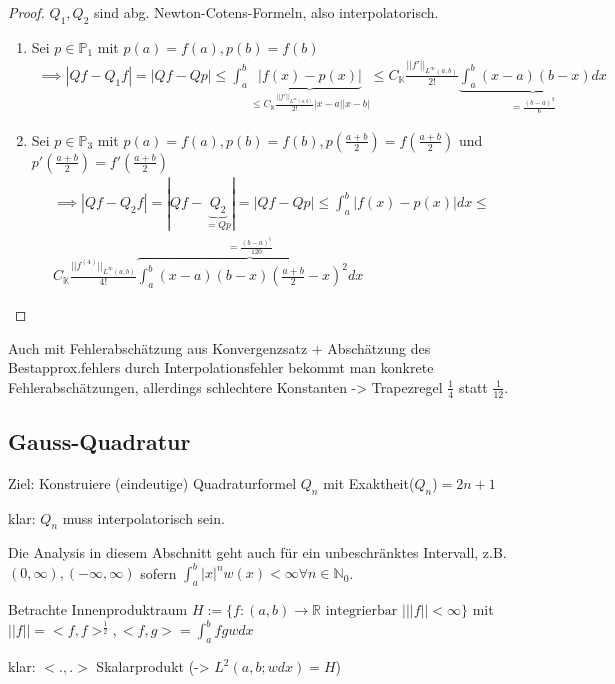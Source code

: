 \begin{proof}
	$Q_1, Q_2$ sind abg. Newton-Cotens-Formeln, also interpolatorisch.
	\begin{enumerate}
		\item Sei $p \in \mathbb{P}_1$ mit $p(a)=f(a), p(b)=f(b)$
		\begin{align*}
			\implies |Qf - Q_1f| = |Qf - Qp| \leq \int_{a}^{b} \underbrace{|f(x) - p(x)|}_{\leq C_{\mathbb{K}} \frac{||f'||_{L^\infty(a,b)}}{2!} |x-a| |x-b|} \leq
			C_{\mathbb{K}} \frac{||f'||_{L^\infty(a,b)}}{2!} \underbrace{\int_{a}^{b}(x-a)(b-x) dx}_{= \frac{(b-a)^3}{6}}
		\end{align*}
		\item Sei $p \in \mathbb{P}_3$ mit $p(a)=f(a), p(b)=f(b), p\left(\frac{a+b}{2}\right) = f\left(\frac{a+b}{2}\right)$ und $p'\left(\frac{a+b}{2}\right) = f'\left(\frac{a+b}{2}\right)$
		\begin{align*}
			\implies |Qf - Q_2f| = |Qf - \underbrace{Q_2}_{=Qp}| = |Qf - Qp| \leq \int_{a}^{b} |f(x) - p(x)| dx \leq\\
			C_{\mathbb{K}} \frac{||f^{(4)}||_{L^\infty(a,b)}}{4!} \overbrace{\int_{a}^{b} (x-a)(b-x) \left(\frac{a+b}{2} - x\right)^2 dx}^{=\frac{(b-a)^5}{120}}
		\end{align*}
	\end{enumerate}
\end{proof}

\begin{remark}
	Auch mit Fehlerabschätzung aus Konvergenzsatz + Abschätzung des Bestapprox.fehlers durch Interpolationsfehler bekommt man konkrete Fehlerabschätzungen, allerdings schlechtere Konstanten -> Trapezregel $\frac{1}{4}$ statt $\frac{1}{12}$.
\end{remark}

\subsection{Gauss-Quadratur}

Ziel: Konstruiere (eindeutige) Quadraturformel $Q_n$ mit Exaktheit($Q_n$)$=2n+1$

klar: $Q_n$ muss interpolatorisch sein.

\begin{remark}
	Die Analysis in diesem Abschnitt geht auch für ein unbeschränktes Intervall, z.B. $(0, \infty), (-\infty, \infty)$ sofern $\int_{a}^{b} |x|^n w(x) < \infty \forall n \in \mathbb{N}_0$.
	
	Betrachte Innenproduktraum $H := \{f:(a,b) \rightarrow \mathbb{R} \text{ integrierbar }| ||f|| < \infty\}$ mit $||f|| = <f,f>^{\frac{1}{2}}, <f,g> = \int_{a}^{b} fgw dx$
	
	klar: $<., .>$ Skalarprodukt (-> $L^2(a,b;wdx) = H$)
\end{remark}

